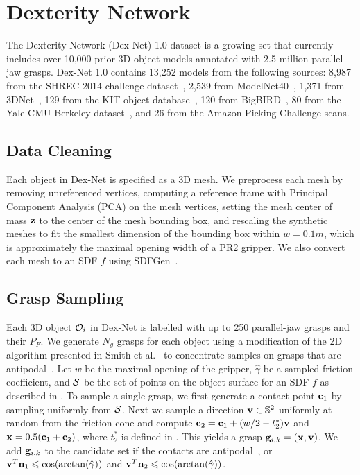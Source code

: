 \section{Dexterity Network}

The Dexterity Network (Dex-Net) 1.0 dataset is a growing set that currently includes over 10,000 prior 3D object models annotated with 2.5 million parallel-jaw grasps.
Dex-Net 1.0 contains 13,252 models from the following sources: 8,987 from the SHREC 2014 challenge dataset~\cite{li2015comparison}, 2,539 from ModelNet40~\cite{wu20153d}, 1,371 from 3DNet~\cite{wohlkinger20123dnet}, 129 from the KIT object database~\cite{kasper2012kit}, 120 from BigBIRD~\cite{singh2014bigbird}, 80 from the Yale-CMU-Berkeley dataset~\cite{calli2015benchmarking}, and 26 from the Amazon Picking Challenge scans.

\subsection{Data Cleaning}
Each object in Dex-Net is specified as a 3D mesh.
We preprocess each mesh by removing unreferenced vertices, computing a reference frame with Principal Component Analysis (PCA) on the mesh vertices, setting the mesh center of mass $\mathbf{z}$ to the center of the mesh bounding box, and rescaling the synthetic meshes to fit the smallest dimension of the bounding box within $w = 0.1m$, which is approximately the maximal opening width of a PR2 gripper.
We also convert each mesh to an SDF $f$ using SDFGen~\cite{sdfgen}.

\subsection{Grasp Sampling}
Each 3D object $\mathcal{O}_i$ in Dex-Net is labelled with up to 250 parallel-jaw grasps and their $P_F$.
We generate $N_g$ grasps for each object using a modification of the 2D algorithm presented in Smith et al.~\cite{smith1999computing} to concentrate samples on grasps that are antipodal~\cite{mahler2015gp}.
Let $w$ be the maximal opening of the gripper, $\hat{\gamma}$ be a sampled friction coefficient, and $\mathcal{S}$ be the set of points on the object surface for an SDF $f$ as described in .
To sample a single grasp, we first generate a contact point $\mathbf{c}_1$ by sampling uniformly from $\mathcal{S}$.%
Next we sample a direction $\mathbf{v} \in \mathbb{S}^2$ uniformly at random from the friction cone and compute $\mathbf{c}_2 = \mathbf{c}_1 + (w / 2 - t_2^*) \mathbf{v}$ and $\mathbf{x} = 0.5 (\mathbf{c}_1 + \mathbf{c}_2)$, where $t_2^*$ is defined in .
This yields a grasp $\mathbf{g}_{i,k} = (\mathbf{x}, \mathbf{v})$.
We add $\mathbf{g}_{i,k}$ to the candidate set if the contacts are antipodal~\cite{mahler2015gp}, or $\mathbf{v}^T \mathbf{n}_1 \leqslant \cos(\arctan(\hat{\gamma}))$ and $\mathbf{v}^T \mathbf{n}_2 \leqslant \cos(\arctan(\hat{\gamma}))$.

